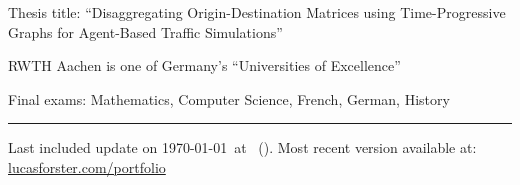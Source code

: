 \documentclass[12pt,a4paper,ragged2e,withhyper]{altacv} %
\begin{document}
\begin{paracol}{2}

Thesis title:
``Disaggregating Origin-Destination Matrices
using Time-Progressive Graphs for Agent-Based Traffic Simulations''

\smallskip

RWTH Aachen is one of Germany's ``Universities of Excellence''



\divider


Final exams: Mathematics, Computer Science, French, German, History

\end{paracol}

\vfill
\hrule
\medskip
\small{
    Last included update on \today~at \DTMcurrenttime~(\DTMcurrentzone).
    Most recent version available at: \url{lucasforster.com/portfolio}
}
\end{document}
